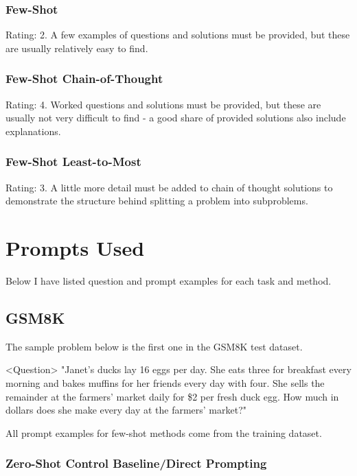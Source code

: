 \documentclass[11pt]{article}
\begin{document}
\subsubsection*{Few-Shot}

Rating: 2. A few examples of questions and solutions must be provided, but these are usually relatively easy to find.

\subsubsection*{Few-Shot Chain-of-Thought}

Rating: 4. Worked questions and solutions must be provided, but these are usually not very difficult to find - a good share of provided solutions also include explanations.

\subsubsection*{Few-Shot Least-to-Most}

Rating: 3. A little more detail must be added to chain of thought solutions to demonstrate the structure behind splitting a problem into subproblems.

\clearpage
\newpage

\section{Prompts Used}
\label{sec:prompts}

Below I have listed question and prompt examples for each task and method.

\subsection{GSM8K}

The sample problem below is the first one in the GSM8K test dataset. \cite{cobbe_training_2021}

<Question> "Janet's ducks lay 16 eggs per day. She eats three for breakfast every morning and bakes muffins for her friends every day with four. She sells the remainder at the farmers' market daily for \$2 per fresh duck egg. How much in dollars does she make every day at the farmers' market?"

All prompt examples for few-shot methods come from the training dataset.

\subsubsection*{Zero-Shot Control Baseline/Direct Prompting}
\end{document}
